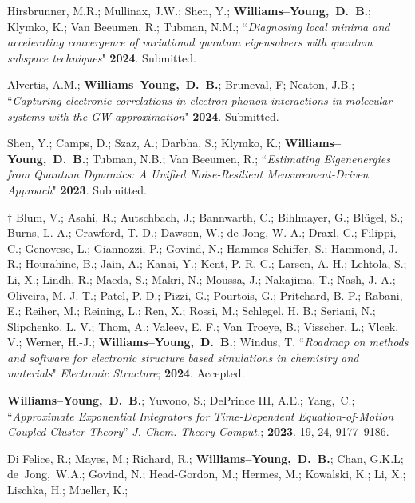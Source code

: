 \documentclass[10pt]{res} %
\newcommand*\me[0]{{\bf Williams--Young,~D.~B.}}
\newcommand*\cy[0]{Yang,~C.}
\newcommand*\bdj[0]{de~Jong,~W.A.}
\begin{document}
\begin{resume}
\begin{etaremune}
  \item Hirsbrunner, M.R.; Mullinax, J.W.; Shen, Y.; \me; Klymko, K.; Van Beeumen, R.; Tubman, N.M.;
        ``\emph{Diagnosing local minima and accelerating convergence of variational quantum eigensolvers with quantum subspace techniques}"
       \textbf{2024}. Submitted.
  \item Alvertis, A.M.; \me; Bruneval, F; Neaton, J.B.;
       ``\emph{Capturing electronic correlations in electron-phonon interactions in molecular systems with the GW approximation}"
       \textbf{2024}. Submitted.
  \item Shen, Y.; Camps, D.; Szaz, A.; Darbha, S.; Klymko, K.; \me; Tubman, N.B.; Van Beeumen, R.;
        ``\emph{Estimating Eigenenergies from Quantum Dynamics: A Unified Noise-Resilient Measurement-Driven Approach}"
        \textbf{2023}. Submitted.
  \item $\dagger$ Blum, V.; Asahi, R.; Autschbach, J.; Bannwarth, C.; Bihlmayer, G.; Blügel, S.; Burns, L. A.; 
        Crawford, T. D.; Dawson, W.; de Jong, W. A.; Draxl, C.; Filippi, C.; Genovese, L.; Giannozzi, P.; 
        Govind, N.; Hammes-Schiffer, S.; Hammond, J. R.; Hourahine, B.; Jain, A.; Kanai, Y.; Kent, P. R. C.; 
        Larsen, A. H.; Lehtola, S.; Li, X.; Lindh, R.; Maeda, S.; Makri, N.; Moussa, J.; Nakajima, T.; 
        Nash, J. A.; Oliveira, M. J. T.; Patel, P. D.; Pizzi, G.; Pourtois, G.; Pritchard, B. P.; Rabani, E.; 
        Reiher, M.; Reining, L.; Ren, X.; Rossi, M.; Schlegel, H. B.; Seriani, N.; Slipchenko, L. V.; Thom, A.; 
        Valeev, E. F.; Van Troeye, B.; Visscher, L.; Vlcek, V.; Werner, H.-J.; \me; Windus, T.
        ``\emph{Roadmap on methods and software for electronic structure based simulations in chemistry and materials}"
        \emph{Electronic Structure}; \textbf{2024}. Accepted.
  \item \me; Yuwono, S.; DePrince III, A.E.; \cy; 
        ``\emph{Approximate Exponential Integrators for Time-Dependent Equation-of-Motion Coupled Cluster Theory}”
	\emph{J. Chem. Theory Comput.}; \textbf{2023}. 19, 24, 9177–9186.
  \item Di Felice, R.; Mayes, M.; Richard, R.; \me; Chan, G.K.L; \bdj; 
        Govind, N.; Head-Gordon, M.; Hermes, M.; Kowalski, K.; Li, X.; Lischka, H.; Mueller, K.; 

\end{etaremune}
\end{resume}
\end{document}
